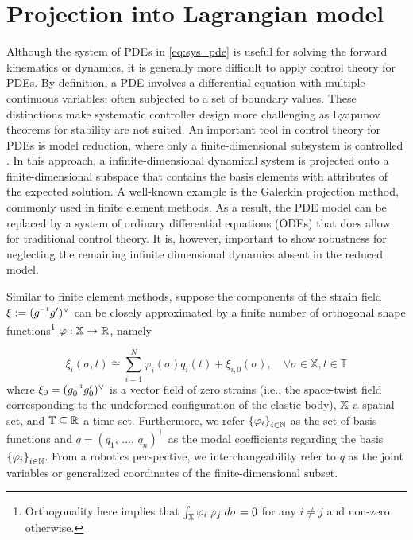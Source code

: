 \clearpage 
\section{Projection into Lagrangian model}
Although the system of PDEs in \eqref{eq:sys_pde} is useful for solving the forward kinematics or dynamics, it is generally more difficult to apply control theory for PDEs. By definition, a PDE involves a differential equation with multiple continuous variables; often subjected to a set of boundary values. These distinctions make systematic controller design more challenging as Lyapunov theorems for stability are not suited. An important tool in control theory for PDEs is model reduction, where only a finite-dimensional subsystem is controlled \cite{Benner2014,Astrid2008}. In this approach, a infinite-dimensional dynamical system is projected onto a finite-dimensional subspace that contains the basis elements with attributes of the expected solution. A well-known example is the Galerkin projection method, commonly used in finite element methods. As a result, the PDE model can be replaced by a system of ordinary differential equations (ODEs) that does allow for traditional control theory. It is, however, important to show robustness for neglecting the remaining infinite dimensional dynamics absent in the reduced model.

Similar to finite element methods, suppose the components of the strain field $\xi := (g\inv g')^\vee$ can be closely approximated by a finite number of orthogonal shape functions\footnote[1]{Orthogonality here implies that $\int_{\mathbb{X}}\varphi_i\,\varphi_j\; d\sigma = 0$ for any $i \neq j$ and non-zero otherwise.} $\varphi: \mathbb{X} \to \mathbb{R}$, namely 

\begin{equation}
\xi_i(\sigma,t) \cong \sum^N_{i=1} \varphi_i(\sigma) q_i(t) + \xi_{i,0}(\sigma), \quad \forall \sigma \in \mathbb{X}, t \in \mathbb{T}
\end{equation}
%
where $\xi_0 = (g_0\inv g_0')^{\vee}$ is a vector field of zero strains (i.e., the space-twist field corresponding to the undeformed configuration of the elastic body), $\mathbb{X}$ a spatial set, and $\mathbb{T} \subseteq \mathbb{R}$ a time set. Furthermore, we refer $\left\{ \varphi_i \right \}_{i\in \mathbb{N}}$ as the set of basis functions and $q = (q_1,\,...,\,q_n)^\top$ as the modal coefficients regarding the basis $\left\{ \varphi_i \right \}_{i\in \mathbb{N}}$. From a robotics perspective, we interchangeability refer to $q$ as the joint variables or generalized coordinates of the finite-dimensional subset.

